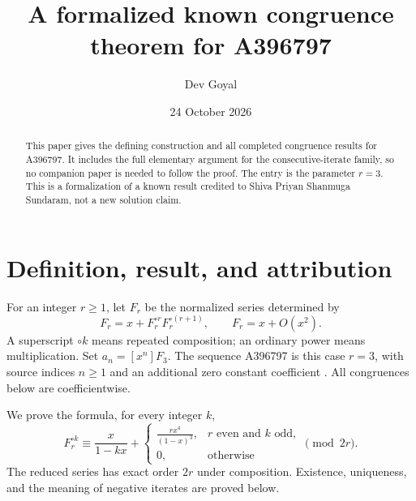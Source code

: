 \documentclass[11pt,a4paper]{article}
\title{A formalized known congruence theorem for A396797}
\author{Dev Goyal}
\date{24 October 2026}
\theoremstyle{remark}\newtheorem{remark}[theorem]{Remark}
\begin{document}
\maketitle
\begin{center}\end{center}

\begin{abstract}
This paper gives the defining construction and all completed congruence
results for A396797. It includes the full elementary argument for the
consecutive-iterate family, so no companion paper is needed to follow the
proof. The entry is the parameter $r=3$.
This is a formalization of a known result credited to Shiva Priyan Shanmuga Sundaram, not a new solution claim.
\end{abstract}
\section{Definition, result, and attribution}
For an integer $r\ge1$, let $F_r$ be the normalized series determined by
\begin{equation}\label{eq:family}
 F_r=x+F_r^{\circ r}F_r^{\circ(r+1)},\qquad F_r=x+O(x^2).
\end{equation}
A superscript $\circ k$ means repeated composition; an ordinary power
means multiplication. Set $a_n=[x^n]F_{3}$.
The sequence A396797 is this case $r=3$, with source
indices $n\ge1$ and an additional zero constant coefficient \cite{oeis}.
All congruences below are coefficientwise.

We prove the formula, for every integer $k$,
\[
F_r^{\circ k}\equiv
\frac{x}{1-kx}+
\begin{cases}
\displaystyle\frac{rx^4}{(1-x)^3},&r\text{ even and }k\text{ odd},\\[5pt]
0,&\text{otherwise}
\end{cases}
\pmod{2r}.
\]
The reduced series has exact order $2r$ under composition. Existence,
uniqueness, and the meaning of negative iterates are proved below.
\end{document}
